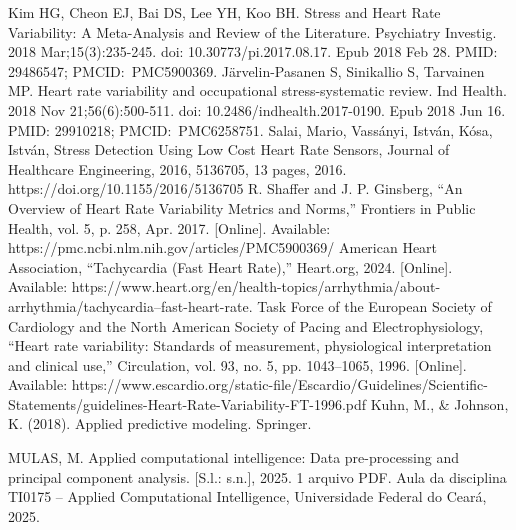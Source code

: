 \documentclass[conference]{IEEEtran}
\begin{document}
\begin{thebibliography}{00}
 Kim HG, Cheon EJ, Bai DS, Lee YH, Koo BH. Stress and Heart Rate Variability: A Meta-Analysis and Review of the Literature. Psychiatry Investig. 2018 Mar;15(3):235-245. doi: 10.30773/pi.2017.08.17. Epub 2018 Feb 28. PMID: 29486547; PMCID: PMC5900369.
 Järvelin-Pasanen S, Sinikallio S, Tarvainen MP. Heart rate variability and occupational stress-systematic review. Ind Health. 2018 Nov 21;56(6):500-511. doi: 10.2486/indhealth.2017-0190. Epub 2018 Jun 16. PMID: 29910218; PMCID: PMC6258751.
 Salai, Mario, Vassányi, István, Kósa, István, Stress Detection Using Low Cost Heart Rate Sensors, Journal of Healthcare Engineering, 2016, 5136705, 13 pages, 2016. https://doi.org/10.1155/2016/5136705 
 R. Shaffer and J. P. Ginsberg, “An Overview of Heart Rate Variability Metrics and Norms,” Frontiers in Public Health, vol. 5, p. 258, Apr. 2017. [Online]. Available: https://pmc.ncbi.nlm.nih.gov/articles/PMC5900369/
 American Heart Association, “Tachycardia (Fast Heart Rate),” Heart.org, 2024. [Online]. Available: https://www.heart.org/en/health-topics/arrhythmia/about-arrhythmia/tachycardia--fast-heart-rate.
 Task Force of the European Society of Cardiology and the North American Society of Pacing and Electrophysiology, “Heart rate variability: Standards of measurement, physiological interpretation and clinical use,” Circulation, vol. 93, no. 5, pp. 1043–1065, 1996. [Online]. Available: https://www.escardio.org/static-file/Escardio/Guidelines/Scientific-Statements/guidelines-Heart-Rate-Variability-FT-1996.pdf
 Kuhn, M., \& Johnson, K. (2018). Applied predictive modeling. Springer.

 MULAS, M. Applied computational intelligence: Data pre-processing and principal component analysis. [S.l.: s.n.], 2025. 1 arquivo PDF. Aula da disciplina TI0175 – Applied Computational Intelligence, Universidade Federal do Ceará, 2025.
\end{thebibliography}
\end{document}
